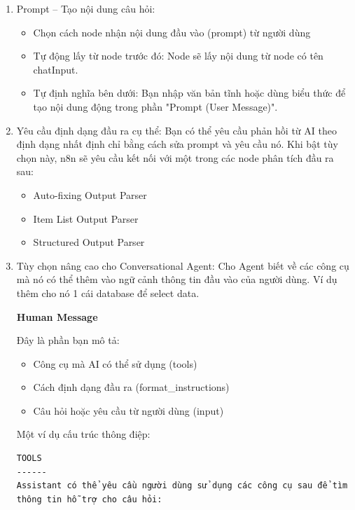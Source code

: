 \begin{enumerate}
    \item Prompt – Tạo nội dung câu hỏi: 
    
    \begin{itemize}
        \item Chọn cách node nhận nội dung đầu vào (prompt) từ người dùng
        \item Tự động lấy từ node trước đó: Node sẽ lấy nội dung từ node có tên chatInput.
        \item Tự định nghĩa bên dưới: Bạn nhập văn bản tĩnh hoặc dùng biểu thức để tạo nội dung động trong phần "Prompt (User Message)".
    \end{itemize}

    \item Yêu cầu định dạng đầu ra cụ thể: Bạn có thể yêu cầu phản hồi từ AI theo định dạng nhất định chỉ bằng cách sửa prompt và yêu cầu nó. Khi bật tùy chọn này, n8n sẽ yêu cầu kết nối với một trong các node phân tích đầu ra sau:
    \begin{itemize}
        \item Auto-fixing Output Parser

        \item Item List Output Parser

        \item Structured Output Parser
    \end{itemize}

    \item Tùy chọn nâng cao cho Conversational Agent: Cho Agent biết về các công cụ  mà nó có thể thêm vào ngữ cảnh thông tin đầu vào của người dùng. Ví dụ thêm cho nó 1 cái database để select data.

\textbf{Human Message}

Đây là phần bạn mô tả:
\begin{itemize}
    \item Công cụ mà AI có thể sử dụng ({tools})

    \item Cách định dạng đầu ra ({format\_instructions})

    \item Câu hỏi hoặc yêu cầu từ người dùng ({{input}})

\end{itemize}
Một ví dụ cấu trúc thông điệp:
\begin{verbatim}
TOOLS
------
Assistant có thể yêu cầu người dùng sử dụng các công cụ sau để tìm thông tin hỗ trợ cho câu hỏi:


\end{verbatim}
\end{enumerate}

